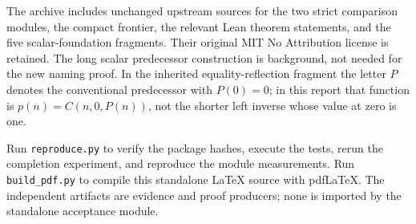 \documentclass[11pt]{article}
\theoremstyle{definition}\newtheorem{definition}[theorem]{Definition}
\theoremstyle{remark}\newtheorem{remark}[theorem]{Remark}
\newcommand{\file}[1]{\texttt{\small\nolinkurl{#1}}}
\begin{document}
The archive includes unchanged upstream sources for the two strict
comparison modules, the compact frontier, the relevant Lean theorem
statements, and the five scalar-foundation fragments. Their original
MIT No Attribution license is retained. The long scalar predecessor
construction is background, not needed for the new naming proof.
In the inherited equality-reflection fragment the letter $P$ denotes
the conventional predecessor with $P(0)=0$; in this report that function
is $p(n)=C(n,0,P(n))$, not the shorter left inverse whose value at zero
is one.

Run \file{reproduce.py} to verify the package hashes, execute the tests,
rerun the completion experiment, and reproduce the module measurements.
Run \file{build_pdf.py} to compile this standalone LaTeX source with
pdfLaTeX. The independent artifacts are evidence and proof producers;
none is imported by the standalone acceptance module.
\end{document}

